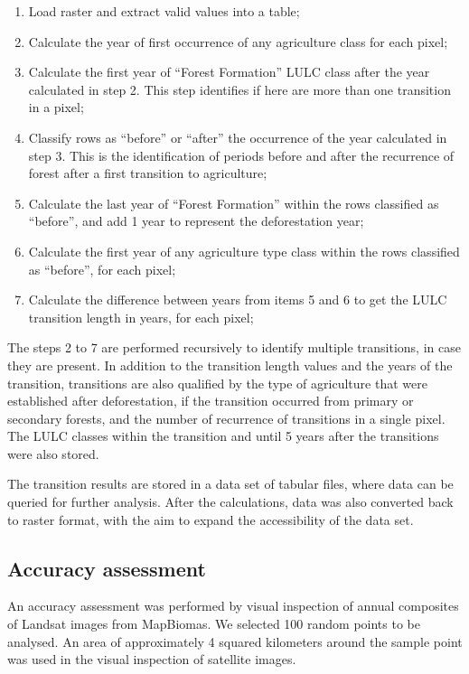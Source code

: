 \documentclass[essd, manuscript]{copernicus}
\begin{document}
\begin{enumerate}
\def\labelenumi{\arabic{enumi}.}
\item
  Load raster and extract valid values into a table;
\item
  Calculate the year of first occurrence of any agriculture class for each pixel;
\item
  Calculate the first year of ``Forest Formation'' LULC class after the year calculated in step 2.
  This step identifies if here are more than one transition in a pixel;
\item
  Classify rows as ``before'' or ``after'' the occurrence of the year calculated in step 3.
  This is the identification of periods before and after the recurrence of forest after a first transition to agriculture;
\item
  Calculate the last year of ``Forest Formation'' within the rows classified as ``before'', and add 1 year to represent the deforestation year;
\item
  Calculate the first year of any agriculture type class within the rows classified as ``before'', for each pixel;
\item
  Calculate the difference between years from items 5 and 6 to get the LULC transition length in years, for each pixel;
\end{enumerate}

The steps 2 to 7 are performed recursively to identify multiple transitions, in case they are present.
In addition to the transition length values and the years of the transition, transitions are also qualified by the type of agriculture that were established after deforestation, if the transition occurred from primary or secondary forests, and the number of recurrence of transitions in a single pixel.
The LULC classes within the transition and until 5 years after the transitions were also stored.

The transition results are stored in a data set of tabular files, where data can be queried for further analysis.
After the calculations, data was also converted back to raster format, with the aim to expand the accessibility of the data set.

\subsection{Accuracy assessment}

An accuracy assessment was performed by visual inspection of annual composites of Landsat images from MapBiomas.
We selected 100 random points to be analysed.
An area of approximately 4 squared kilometers around the sample point was used in the visual inspection of satellite images.
\end{document}
